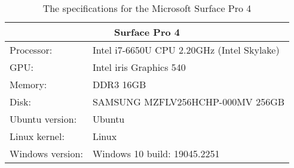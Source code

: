 \begin{table}[H]
    \begin{tabular}{ll}
    \hline
    \multicolumn{2}{|c|}{Surface Pro 4}           \\ \hline
    Processor: & Intel i7-6650U CPU 2.20GHz (Intel Skylake) \\
    GPU:       & Intel iris Graphics 540          \\
    Memory:    & DDR3 16GB                         \\
    Disk:      & SAMSUNG MZFLV256HCHP-000MV 256GB   \\
    Ubuntu version:  & Ubuntu                            \\
    Linux kernel: & Linux        \\
    Windows version:& Windows 10 build: 19045.2251
    \end{tabular}
    \caption{The specifications for the Microsoft Surface Pro 4}
    \label{tab:surfacePro}
\end{table} 